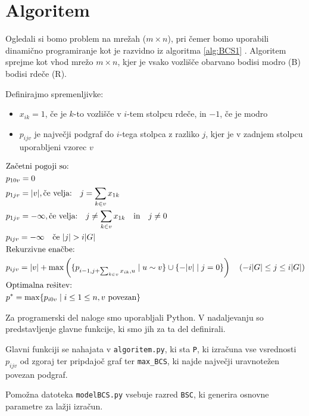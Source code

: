 \documentclass[a4paper, 11pt]{article}
\theoremstyle{definition}
\theoremstyle{definition}
\begin{document}
\section{Algoritem}
    Ogledali si bomo problem na mrežah ($ m \times n$), pri čemer bomo uporabili
    dinamično programiranje kot je razvidno iz algoritma \ref{alg:BCS1} .    
    Algoritem sprejme kot vhod mrežo $m \times n$, kjer je vsako vozlišče
    obarvano bodisi modro (B) bodisi rdeče (R). 

    Definirajmo spremenljivke:
    \begin{itemize}
        \item 
        $x_{ik} = 1$, če je $k$-to vozlišče v $i$-tem stolpcu rdeče, in $-1$, če je modro
        \item 
        $p_{ijv}$ je največji podgraf do $i$-tega stolpca z razliko $j$, kjer je v zadnjem stolpcu uporabljeni vzorec $v$   
    \end{itemize}
    
    $$
    \begin{aligned}
    &\textnormal{Začetni pogoji so:} \\
    &p_{10v} = 0 \\    
    &p_{1jv} = |v|, \text{če velja:} \quad j = \sum_{k \in v}x_{1k} \\ 
    &p_{1jv} = -\infty, \text{če velja:} \quad j \ne \sum_{k \in v}x_{1k} \quad \textnormal{in} \quad j\ne 0 \\ 
    &p_{ijv} = -\infty \quad \text{če $|j| > i |G|$} \\
    &\textnormal{Rekurzivne enačbe:} \\
    &p_{ijv} = |v| + \max\left(\{p_{i-1, j + \sum_{k \in v} x_{ik}, u} \mid u \sim v\} \cup \{-|v| \mid j = 0\}\right) \quad (-i|G| \le j \le i|G|) \\
    &\textnormal{Optimalna rešitev:} \\
    &p^* = \max\{p_{i0v} \mid i \le 1 \le n, v \text{ povezan}\}
    \end{aligned}
    $$


Za programerski del naloge smo uporabljali Python. V nadaljevanju so predstavljenje glavne funkcije, 
ki smo jih za ta del definirali.

Glavni funkciji se nahajata v \verb+algoritem.py+, ki 
sta \verb+P+, ki izračuna vse vsrednosti $p_{ijv}$ od zgoraj ter 
pripdajoč graf ter \verb+max_BCS+, ki najde največji
uravnotežen povezan podgraf.  

Pomožna datoteka \verb+modelBCS.py+ vsebuje razred
\verb+BSC+, ki generira osnovne parametre za lažji izračun.
\newpage
\end{document}
